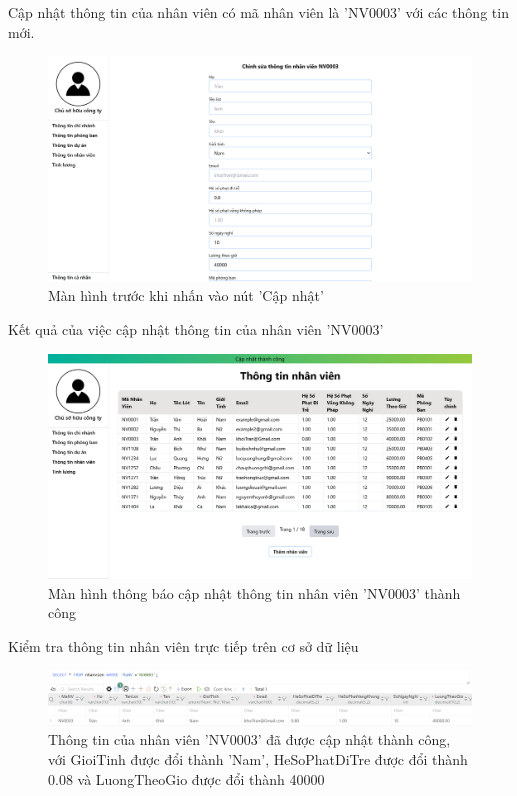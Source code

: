 Cập nhật thông tin của nhân viên có mã nhân viên là 'NV0003' với các thông tin mới.
\begin{figure}[H]
    \centering
    \includegraphics[width=0.75\linewidth]{content/images/ManHinh_1_g.png}
    \caption{Màn hình trước khi nhấn vào nút 'Cập nhật'}
    \label{fig:ManHinh_1_g}
\end{figure}

Kết quả của việc cập nhật thông tin của nhân viên 'NV0003'
\begin{figure}[H]
    \centering
    \includegraphics[width=0.75\linewidth]{content/images/ManHinh_1_h.png}
    \caption{Màn hình thông báo cập nhật thông tin nhân viên 'NV0003' thành công}
    \label{fig:ManHinh_1_h}
\end{figure}

Kiểm tra thông tin nhân viên trực tiếp trên cơ sở dữ liệu
\begin{figure}[H]
    \centering
    \includegraphics[width=0.75\linewidth]{content/images/ManHinh_1_i.png}
    \caption{Thông tin của nhân viên 'NV0003' đã được cập nhật thành công, với GioiTinh được đổi thành 'Nam', HeSoPhatDiTre được đổi thành 0.08 và LuongTheoGio được đổi thành 40000}
    \label{fig:ManHinh_1_i}
\end{figure}

